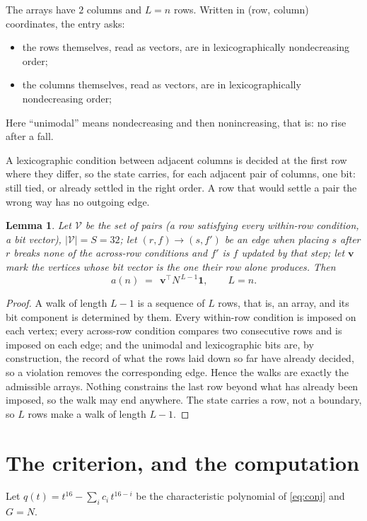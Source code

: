 \documentclass[11pt,a4paper]{article}
\theoremstyle{plain}
\newtheorem{lemma}[theorem]{Lemma}
\theoremstyle{definition}
\begin{document}
The arrays have $2$ columns and $L=n$ rows. Written in (row, column)
coordinates, the entry asks:
\begin{itemize}
\item the rows themselves, read as vectors, are in lexicographically nondecreasing order;
\item the columns themselves, read as vectors, are in lexicographically nondecreasing order;
\end{itemize}
Here ``unimodal'' means nondecreasing and then nonincreasing, that is: no rise after a fall.

A lexicographic condition between adjacent columns is decided
at the first row where they differ, so the state carries, for each adjacent pair of
columns, one bit: still tied, or already settled in the right order. A row that would
settle a pair the wrong way has no outgoing edge.

\begin{lemma}\label{lem:walk}
Let $\mathcal V$ be the set of pairs (a row satisfying every within-row condition, a
bit vector), $|\mathcal V|=S=32$; let $(r,f)\to(s,f')$ be an edge when placing $s$ after $r$
breaks none of the across-row conditions and $f'$ is $f$ updated by that step; let
$\mathbf{v}$ mark the vertices whose bit vector is the one their row alone produces.
Then
\[
a(n)\;=\;\,\mathbf{v}^{\!\top}N^{\,L-1}\mathbf{1},\qquad L=n.
\]
\end{lemma}

\begin{proof}
A walk of length $L-1$ is a sequence of $L$ rows, that is, an array, and its bit component
is determined by them. Every within-row condition is imposed on each vertex; every
across-row condition compares two consecutive rows and is imposed on each edge; and the
unimodal and lexicographic bits are, by construction, the record of what the rows laid down
so far have already decided, so a violation removes the corresponding edge. Hence the walks
are exactly the admissible arrays. Nothing constrains the last row beyond what has already
been imposed, so the walk may end anywhere. The state carries a row, not a boundary, so
$L$ rows make a walk of length $L-1$.
\end{proof}

\section{The criterion, and the computation}

Let $q(t)=t^{16}-\sum_i c_i\,t^{16-i}$ be the characteristic polynomial of
\eqref{eq:conj} and $G=N$.
\end{document}
